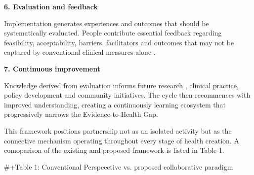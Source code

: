 \documentclass{article}
\begin{document}
\textbf{\textbf{6. Evaluation and feedback}}

Implementation generates experiences and outcomes that should be systematically evaluated. People contribute essential feedback regarding feasibility, acceptability, barriers, facilitators and outcomes that may not be captured by conventional clinical measures alone \cite{IOM2013}.

\textbf{\textbf{7. Continuous improvement}}

Knowledge derived from evaluation informs future research \cite{IOM2013} \cite{Eccles2006}, clinical practice, policy development and community initiatives. The cycle then recommences with improved understanding, creating a continuously learning ecosystem that progressively narrows the Evidence-to-Health Gap.

This framework positions partnership not as an isolated activity but as the connective mechanism operating throughout every stage of health creation. A comoparison of the existing and proposed framework is listed in Table-1.

\#+Table 1: Conventional Perspeective vs. proposed collaborative paradigm
\end{document}

